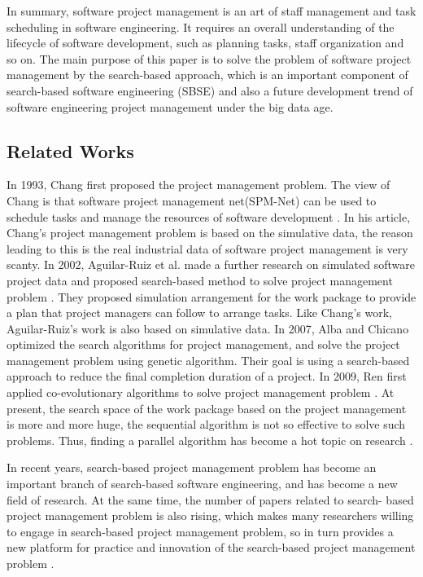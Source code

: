 In summary, software project management is an art of staff management and task
scheduling in software engineering. It requires an overall understanding of the
lifecycle of software development, such as planning tasks, staff organization
and so on. The main purpose of this paper is to solve the problem of software
project management by the search-based approach, which is an important component
of search-based software engineering (SBSE) and also a future development
trend of software engineering project management under the big data age.


\subsection{Related Works}
%
In 1993, Chang first proposed the project management problem. The view of 
Chang is that software project management net(SPM-Net) can be used to 
schedule tasks and manage the resources of software development \cite{chang}. 
In his article, Chang's project management problem is based on the simulative 
data, the reason leading to this is the real industrial data of software 
project management is very scanty. In 2002, Aguilar-Ruiz et al. made a 
further research on simulated software project data and proposed search-based 
method to solve project management problem \cite{alba}. They proposed 
simulation arrangement for the work package to provide a plan that project 
managers can follow to arrange tasks. Like Chang’s work, Aguilar-Ruiz's work 
is also based on simulative data. In 2007, Alba and Chicano optimized the 
search algorithms for project management, and solve the project management 
problem using genetic algorithm. Their goal is using a search-based approach 
to reduce the final completion duration of a project. In 2009, Ren first 
applied co-evolutionary algorithms to solve project management problem 
\cite{ren}. At present, the search space of the work package based on the project 
management is more and more huge, the sequential algorithm is not so 
effective to solve such problems. Thus, finding a parallel algorithm has 
become a hot topic on research \cite{pentico}.


In recent years, search-based project management problem has become an 
important branch of search-based software engineering, and has become a new 
field of research. At the same time, the number of papers related to search-
based project management problem is also rising, which makes many researchers 
willing to engage in search-based project management problem, so in turn 
provides a new platform for practice and innovation of the search-based 
project management problem \cite{penta}.


